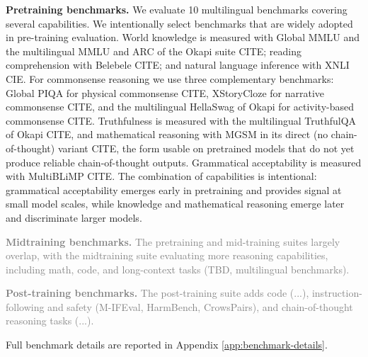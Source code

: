 \documentclass{article}
\newcommand{\futurework}[1]{\textcolor{gray}{#1}}
\begin{document}
\textbf{Pretraining benchmarks.} We evaluate 10 multilingual benchmarks covering several capabilities. We intentionally select benchmarks that are widely adopted in pre-training evaluation.
World knowledge is measured with Global MMLU \citep{singh2024globalmmluunderstandingaddressing} and the multilingual MMLU and ARC of the Okapi suite CITE; reading comprehension with Belebele CITE; and natural language inference with XNLI CIE. For commonsense reasoning we use three complementary benchmarks: Global PIQA for physical commonsense CITE, XStoryCloze for narrative commonsense CITE, and the multilingual HellaSwag of Okapi for activity-based commonsense CITE. Truthfulness is measured with the multilingual TruthfulQA of Okapi CITE, and mathematical reasoning with MGSM in its direct (no chain-of-thought) variant CITE, the form usable on pretrained models that do not yet produce reliable chain-of-thought outputs. Grammatical acceptability is measured with MultiBLiMP CITE. The combination of capabilities is intentional: grammatical acceptability emerges early in pretraining and provides signal at small model scales, while knowledge and mathematical reasoning emerge later and discriminate larger models.


\futurework{
\textbf{Midtraining benchmarks.} The pretraining and mid-training suites largely overlap, with the midtraining suite evaluating more reasoning capabilities, including math, code, and long-context tasks (TBD, multilingual benchmarks).
}

\futurework{
\textbf{Post-training benchmarks.} The post-training suite adds code (...), instruction-following and safety (M-IFEval, HarmBench, CrowsPairs), and chain-of-thought reasoning tasks (...).
}

Full benchmark details are reported in Appendix \ref{app:benchmark-details}.
\end{document}
